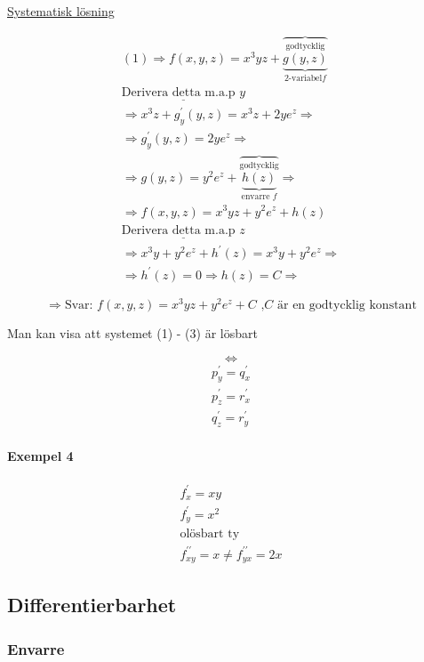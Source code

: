 \documentclass{article}
\begin{document}
\underline{Systematisk lösning}

\[
\begin{split}
	(1) \Rightarrow f(x,y,z) = x^3yz+\overbrace{\underbrace{g(y,z)}^{\text{godtycklig}}_{\text{2-variabel} f}} \\
	\underline{\text{Derivera detta m.a.p } y} \\
	\Rightarrow x^3z+g_{y}^{\prime}(y,z) = x^3z+2ye^z \Rightarrow \\
	\Rightarrow g_{y}^{\prime}(y,z) = 2ye^z \Rightarrow \\
	\Rightarrow g(y,z) = y^2e^z + \overbrace{\underbrace{h(z)}^{\text{godtycklig}}_{\text{envarre }f}} \Rightarrow \\
	\Rightarrow f(x,y,z) = x^3yz+y^2e^z+h(z) \\
	\underline{\text{Derivera detta m.a.p } z} \\
	\Rightarrow x^3y+y^2e^z+h^{\prime}(z) = x^3y+y^2e^z \Rightarrow \\
	\Rightarrow h^{\prime}(z) = 0 \Rightarrow h(z) = C \Rightarrow
\end{split}
\]

\[
	\Rightarrow \text{Svar: } f(x,y,z) = x^3yz+y^2e^z+C \text{ ,\(C\) är en godtycklig konstant}
\]

\centerline{Man kan visa att systemet (1) - (3) är lösbart}
\[
	\iff
\]
\[
\begin{split}
	p_{y}^{\prime} = q_{x}^{\prime} \\
	p_{z}^{\prime} = r_{x}^{\prime} \\
	q_{z}^{\prime} = r_{y}^{\prime} 
\end{split}
\]

\paragraph{Exempel 4}

\[
\begin{split}
	f_{x}^{\prime} = xy \\
	f_{y}^{\prime} = x^2 \\
	\text{olösbart ty} \\
	f_{xy}^{\prime\prime} = x \neq f_{yx}^{\prime\prime} = 2x
\end{split}
\]

\subsection{Differentierbarhet}
\subsubsection*{Envarre}
\end{document}
